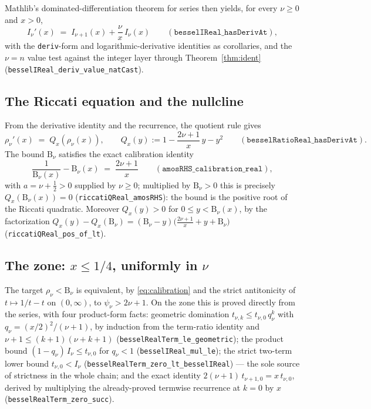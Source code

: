 \documentclass[11pt]{article}
\newcommand{\lean}[1]{\texttt{#1}}
\newcommand{\RHS}{\mathrm{B}}
\begin{document}
Mathlib's dominated-differentiation theorem for series then yields,
for every $\nu \ge 0$ and $x > 0$,
\[
I_\nu'(x) \;=\; I_{\nu+1}(x) + \frac{\nu}{x}\, I_\nu(x)
\qquad (\lean{besselIReal\_hasDerivAt}),
\]
with the \lean{deriv}-form and logarithmic-derivative identities as
corollaries, and the $\nu = n$ value test against the integer layer
through Theorem~\ref{thm:ident}
(\lean{besselIReal\_deriv\_value\_natCast}).

\subsection{The Riccati equation and the nullcline}\label{sec:riccati}

From the derivative identity and the recurrence, the quotient rule
gives
\begin{equation}\label{eq:riccati}
\rho_\nu'(x) \;=\; Q_x(\rho_\nu(x)), \qquad
Q_x(y) := 1 - \frac{2\nu+1}{x}\,y - y^2
\qquad (\lean{besselRatioReal\_hasDerivAt}).
\end{equation}
The bound $\RHS_\nu$ satisfies the exact calibration identity
\begin{equation}\label{eq:calibration}
\frac{1}{\RHS_\nu(x)} - \RHS_\nu(x) \;=\; \frac{2\nu+1}{x}
\qquad (\lean{amosRHS\_calibration\_real}),
\end{equation}
with $a = \nu + \tfrac12 > 0$ supplied by $\nu \ge 0$; multiplied by
$\RHS_\nu > 0$ this is precisely $Q_x(\RHS_\nu(x)) = 0$
(\lean{riccatiQReal\_amosRHS}): the bound is the positive root of
the Riccati quadratic.  Moreover $Q_x(y) > 0$ for
$0 \le y < \RHS_\nu(x)$, by the factorization
$Q_x(y) - Q_x(\RHS_\nu) = (\RHS_\nu - y)\bigl(\tfrac{2\nu+1}{x} + y +
\RHS_\nu\bigr)$ (\lean{riccatiQReal\_pos\_of\_lt}).

\subsection{The zone: $x \le 1/4$, uniformly in $\nu$}\label{sec:zone}

The target $\rho_\nu < \RHS_\nu$ is equivalent, by
\eqref{eq:calibration} and the strict antitonicity of
$t \mapsto 1/t - t$ on $(0,\infty)$, to $\psi_\nu > 2\nu+1$.  On the
zone this is proved directly from the series, with four
product-form facts: geometric domination
$t_{\nu,k} \le t_{\nu,0}\, q_\nu^k$ with $q_\nu = (x/2)^2/(\nu+1)$,
by induction from the term-ratio identity and
$\nu+1 \le (k+1)(\nu+k+1)$
(\lean{besselRealTerm\_le\_geometric}); the product bound
$(1-q_\nu)\, I_\nu \le t_{\nu,0}$ for $q_\nu < 1$
(\lean{besselIReal\_mul\_le});
the strict two-term lower bound $t_{\nu,0} < I_\nu$
(\lean{besselRealTerm\_zero\_lt\_besselIReal}) --- the sole source
of strictness in the whole chain; and the exact identity
$2(\nu+1)\,t_{\nu+1,0} = x\,t_{\nu,0}$, derived by multiplying the
already-proved termwise recurrence at $k=0$ by $x$
(\lean{besselRealTerm\_zero\_succ}).
\end{document}
